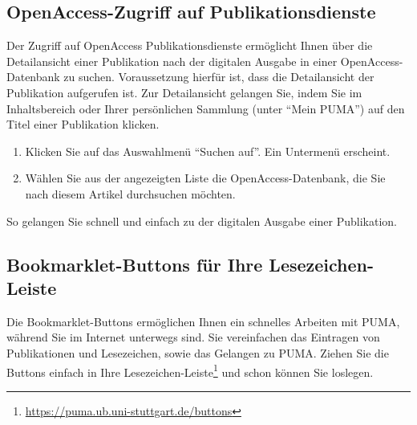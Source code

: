 \documentclass[a4paper,11pt,twoside]{scrbook}
\begin{document}
\subsection{OpenAccess-Zugriff auf Publikationsdienste}%
Der Zugriff auf OpenAccess Publikationsdienste ermöglicht Ihnen über die Detailansicht einer Publikation nach der digitalen Ausgabe in einer OpenAccess-Datenbank zu suchen. Voraussetzung hierfür ist, dass die Detailansicht der Publikation aufgerufen ist. Zur Detailansicht gelangen Sie, indem Sie im Inhaltsbereich oder Ihrer persönlichen Sammlung (unter \enquote{Mein PUMA}) auf den Titel einer Publikation klicken. 
\begin{enumerate}
    \item Klicken Sie auf das Auswahlmenü \enquote{Suchen auf}. Ein Untermenü erscheint.
    \item Wählen Sie aus der angezeigten Liste die OpenAccess-Datenbank, die Sie nach diesem Artikel durchsuchen möchten. 
\end{enumerate}
 So gelangen Sie schnell und einfach zu der digitalen Ausgabe einer Publikation.   
\subsection{Bookmarklet-Buttons für Ihre Lesezeichen-Leiste}
Die Bookmarklet-Buttons ermöglichen Ihnen ein schnelles Arbeiten mit PUMA, während Sie im Internet unterwegs sind. Sie vereinfachen das Eintragen von Publikationen und Lesezeichen, sowie das Gelangen zu PUMA. Ziehen Sie die Buttons einfach in Ihre Lesezeichen-Leiste\footnote{\url{https://puma.ub.uni-stuttgart.de/buttons}} und schon können Sie loslegen.
\end{document}
